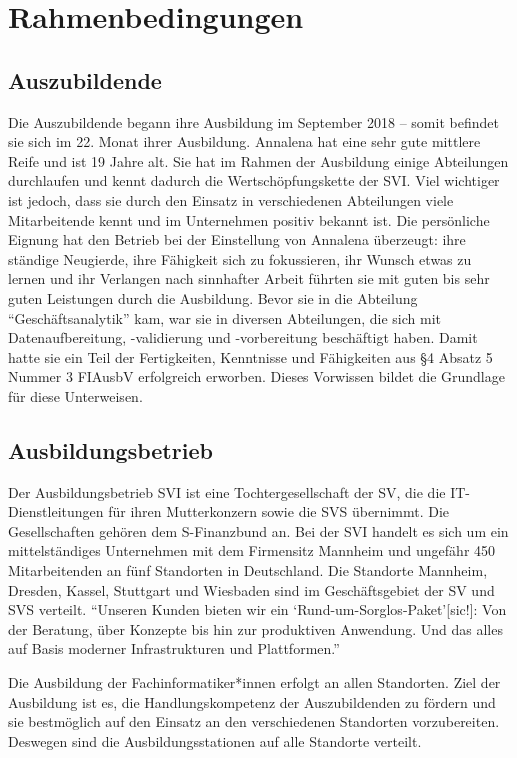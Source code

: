 \chapter{Rahmenbedingungen}

\section{Auszubildende}
Die Auszubildende \Azubi begann ihre Ausbildung im September 2018 -- somit befindet sie sich im 22. Monat ihrer Ausbildung. Annalena hat eine sehr gute mittlere Reife und ist 19 Jahre alt. Sie hat im Rahmen der Ausbildung einige Abteilungen durchlaufen und kennt dadurch die Wertschöpfungskette der \ac{SVI}. Viel wichtiger ist jedoch, dass sie durch den Einsatz in verschiedenen Abteilungen viele Mitarbeitende kennt und im Unternehmen positiv bekannt ist. Die persönliche Eignung hat den Betrieb bei der Einstellung von Annalena überzeugt: ihre ständige Neugierde, ihre Fähigkeit sich zu fokussieren, ihr Wunsch etwas zu lernen und ihr Verlangen nach sinnhafter Arbeit führten sie mit guten bis sehr guten Leistungen durch die Ausbildung. Bevor sie in die Abteilung \enquote{Geschäftsanalytik} kam, war sie in diversen Abteilungen, die sich mit Datenaufbereitung, -validierung und -vorbereitung beschäftigt haben. Damit hatte sie ein Teil der Fertigkeiten, Kenntnisse und Fähigkeiten aus §4 Absatz 5 Nummer 3 \ac{FIAusbV} erfolgreich erworben. Dieses Vorwissen bildet die Grundlage für diese Unterweisen.

\section{Ausbildungsbetrieb}
Der Ausbildungsbetrieb \ac{SVI} ist eine Tochtergesellschaft der \ac{SV}, die die IT-Dienstleitungen für ihren Mutterkonzern sowie die \ac{SVS} übernimmt. Die Gesellschaften gehören dem S-Finanzbund an. Bei der \ac{SVI} handelt es sich um ein mittelständiges Unternehmen mit dem Firmensitz Mannheim und ungefähr 450 Mitarbeitenden\autocite[vgl.][]{sv_informatik_gmbg_uber_2020} an fünf Standorten in Deutschland. Die Standorte Mannheim, Dresden, Kassel, Stuttgart und Wiesbaden sind im Geschäftsgebiet der \ac{SV} und \ac{SVS} verteilt. \enquote{Unseren Kunden bieten wir ein \enquote{Rund-um-Sorglos-Paket}[sic!]: Von der Beratung, über Konzepte bis hin zur produktiven Anwendung. Und das alles auf Basis moderner Infrastrukturen und Plattformen.}\autocite{sv_informatik_gmbg_uber_2020}
\par
Die Ausbildung der Fachinformatiker*innen erfolgt an allen Standorten. Ziel der Ausbildung ist es, die Handlungskompetenz der Auszubildenden zu fördern und sie bestmöglich auf den Einsatz an den verschiedenen Standorten vorzubereiten. Deswegen sind die Ausbildungsstationen auf alle Standorte verteilt.

